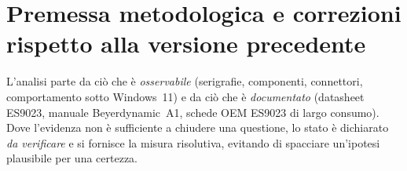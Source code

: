 \tableofcontents
\clearpage

\section{Premessa metodologica e correzioni rispetto alla versione precedente}

L'analisi parte da ciò che è \emph{osservabile} (serigrafie, componenti,
connettori, comportamento sotto Windows~11) e da ciò che è
\emph{documentato} (datasheet ES9023, manuale Beyerdynamic~A1, schede
OEM ES9023 di largo consumo). Dove l'evidenza non è sufficiente a
chiudere una questione, lo stato è dichiarato \emph{da verificare} e si
fornisce la misura risolutiva, evitando di spacciare un'ipotesi
plausibile per una certezza.

